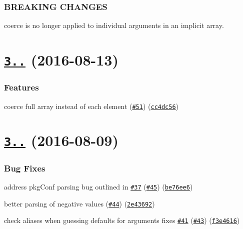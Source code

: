 \subsubsection*{B\+R\+E\+A\+K\+I\+NG C\+H\+A\+N\+G\+ES}


\begin{DoxyItemize}
\item coerce is no longer applied to individual arguments in an implicit array.
\end{DoxyItemize}

\label{_3.2.0}%
 \section*{\href{https://github.com/yargs/yargs-parser/compare/v3.1.0...v3.2.0}{\tt 3..} (2016-\/08-\/13)}

\subsubsection*{Features}


\begin{DoxyItemize}
\item coerce full array instead of each element (\href{https://github.com/yargs/yargs-parser/issues/51}{\tt \#51}) (\href{https://github.com/yargs/yargs-parser/commit/cc4dc56}{\tt cc4dc56})
\end{DoxyItemize}

\label{_3.1.0}%
 \section*{\href{https://github.com/yargs/yargs-parser/compare/v3.0.0...v3.1.0}{\tt 3..} (2016-\/08-\/09)}

\subsubsection*{Bug Fixes}


\begin{DoxyItemize}
\item address pkg\+Conf parsing bug outlined in \href{https://github.com/yargs/yargs-parser/issues/37}{\tt \#37} (\href{https://github.com/yargs/yargs-parser/issues/45}{\tt \#45}) (\href{https://github.com/yargs/yargs-parser/commit/be76ee6}{\tt be76ee6})
\item better parsing of negative values (\href{https://github.com/yargs/yargs-parser/issues/44}{\tt \#44}) (\href{https://github.com/yargs/yargs-parser/commit/2e43692}{\tt 2e43692})
\item check aliases when guessing defaults for arguments fixes \href{https://github.com/yargs/yargs-parser/issues/41}{\tt \#41} (\href{https://github.com/yargs/yargs-parser/issues/43}{\tt \#43}) (\href{https://github.com/yargs/yargs-parser/commit/f3e4616}{\tt f3e4616})
\end{DoxyItemize}

